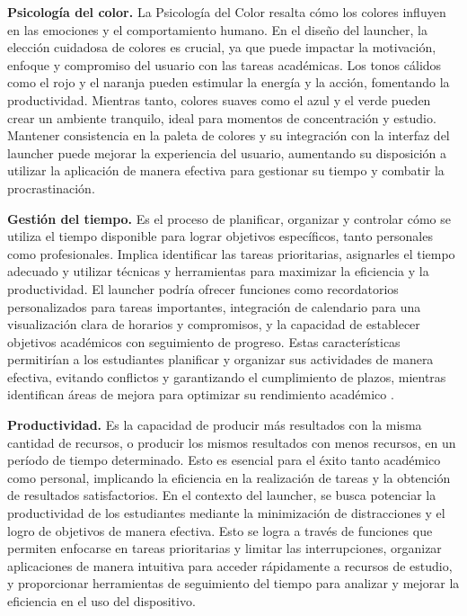\textbf{Psicología del color.} La Psicología del Color resalta cómo los colores influyen en las emociones y el comportamiento humano. En el diseño del launcher, la elección cuidadosa de colores es crucial, ya que puede impactar la motivación, enfoque y compromiso del usuario con las tareas académicas. Los tonos cálidos como el rojo y el naranja pueden estimular la energía y la acción, fomentando la productividad. Mientras tanto, colores suaves como el azul y el verde pueden crear un ambiente tranquilo, ideal para momentos de concentración y estudio. Mantener consistencia en la paleta de colores y su integración con la interfaz del launcher puede mejorar la experiencia del usuario, aumentando su disposición a utilizar la aplicación de manera efectiva para gestionar su tiempo y combatir la procrastinación.

\textbf{Gestión del tiempo.} Es el proceso de planificar, organizar y controlar cómo se utiliza el tiempo disponible para lograr objetivos específicos, tanto personales como profesionales. Implica identificar las tareas prioritarias, asignarles el tiempo adecuado y utilizar técnicas y herramientas para maximizar la eficiencia y la productividad. El launcher podría ofrecer funciones como recordatorios personalizados para tareas importantes, integración de calendario para una visualización clara de horarios y compromisos, y la capacidad de establecer objetivos académicos con seguimiento de progreso. Estas características permitirían a los estudiantes planificar y organizar sus actividades de manera efectiva, evitando conflictos y garantizando el cumplimiento de plazos, mientras identifican áreas de mejora para optimizar su rendimiento académico \cite{Mengual2012}. 

\textbf{Productividad.} Es la capacidad de producir más resultados con la misma cantidad de recursos, o producir los mismos resultados con menos recursos, en un período de tiempo determinado. Esto es esencial para el éxito tanto académico como personal, implicando la eficiencia en la realización de tareas y la obtención de resultados satisfactorios. En el contexto del launcher, se busca potenciar la productividad de los estudiantes mediante la minimización de distracciones y el logro de objetivos de manera efectiva. Esto se logra a través de funciones que permiten enfocarse en tareas prioritarias y limitar las interrupciones, organizar aplicaciones de manera intuitiva para acceder rápidamente a recursos de estudio, y proporcionar herramientas de seguimiento del tiempo para analizar y mejorar la eficiencia en el uso del dispositivo. 


